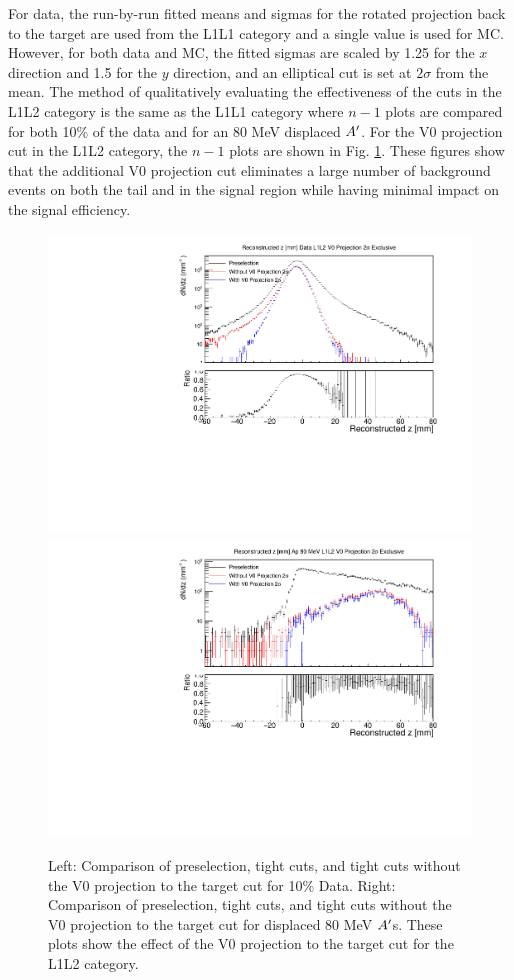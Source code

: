 For data, the run-by-run fitted means and sigmas for the rotated projection back to the target are used from the L1L1 category and a single value is used for MC. However, for both data and MC, the fitted sigmas are scaled by 1.25 for the $x$ direction and 1.5 for the $y$ direction, and an elliptical cut is set at $2\sigma$ from the mean. The method of qualitatively evaluating the effectiveness of the cuts in the L1L2 category is the same as the L1L1 category where $n-1$ plots are compared for both 10\% of the data and for an 80 MeV displaced $A^\prime$. For the V0 projection cut in the L1L2 category, the $n-1$ plots are shown in Fig. \ref{fig:v0proj_L1L2}. These figures show that the additional V0 projection cut eliminates a large number of background events on both the tail and in the signal region while having minimal impact on the signal efficiency. %

\begin{figure}[!ht] 
    \centering
    \includegraphics[width=.45\textwidth]{figs/selection/voproj_n_1_z_L1L2.pdf}
    \includegraphics[width=.45\textwidth]{figs/selection/ap_80MeV_v0proj_n_1_z_L1L2.pdf}
    \caption{
    	Left: Comparison of preselection, tight cuts, and tight cuts without the V0 projection to the target cut for 10\% Data. Right: Comparison of preselection, tight cuts, and tight cuts without the V0 projection to the target cut for displaced 80 MeV $A^\prime$s. These plots show the effect of the V0 projection to the target cut for the L1L2 category.
    }
    \label{fig:v0proj_L1L2}
\end{figure}  

